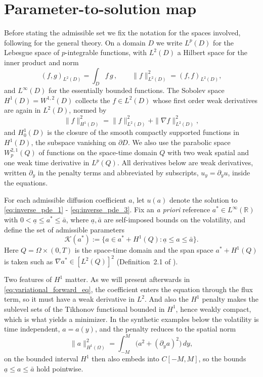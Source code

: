 \section{Parameter-to-solution map}

Before stating the admissible set we fix the notation for the spaces involved,
following \cite[Ch.~8 and 9]{brezis_functional} for the general theory.
On a domain $D$ we write $L^p(D)$ for the Lebesgue space of $p$-integrable functions,
with $L^2(D)$ a Hilbert space for the inner product and norm
\begin{equation*}
    (f,g)_{L^2(D)} = \int_D f\,g\,, \qquad \|f\|_{L^2(D)}^2 = (f,f)_{L^2(D)},
\end{equation*}
and $L^\infty(D)$ for the essentially bounded functions.
The Sobolev space $H^1(D) = W^{1,2}(D)$ collects the $f \in L^2(D)$ whose first order weak
derivatives are again in $L^2(D)$, normed by
\begin{equation*}
    \|f\|_{H^1(D)}^2 = \|f\|_{L^2(D)}^2 + \|\nabla f\|_{L^2(D)}^2,
\end{equation*}
and $H^1_0(D)$ is the closure of the smooth compactly supported functions in $H^1(D)$,
the subspace vanishing on $\partial D$.
We also use the parabolic space $W^{2,1}_p(Q)$ of functions on the space-time domain $Q$
with two weak spatial and one weak time derivative in $L^p(Q)$.
All derivatives below are weak derivatives, written $\partial_y$ in the penalty terms
and abbreviated by subscripts, $u_y = \partial_y u$, inside the equations.

For each admissible diffusion coefficient $a$,
let $u(a)$ denote the solution to \eqref{eq:inverse_pde_1} - \eqref{eq:inverse_pde_3}.
Fix an \emph{a priori} reference $a^* \in L^\infty(\mathbb{R})$ with $0 < \underline{a} \le a^* \le \bar{a}$,
where $\underline{a}, \bar{a}$ are self-imposed bounds on the volatility,
and define the set of admissible parameters
\begin{equation}\label{eq:admissible_set}
    \mathcal{K}(a^*) := \bigl\{ a \in a^* + H^1(Q) : \underline{a} \le a \le \bar{a} \bigr\}.
\end{equation}
Here $Q = \Omega \times (0,T)$ is the space-time domain and the span space $a^* + H^1(Q)$ is taken such as
$\nabla a^* \in [L^2(Q)]^2$ (Definition~2.1 of \cite{egger2005tikhonov}).

Two features of $H^1$ matter.
As we will present afterwards in \eqref{eq:variational_forward_eq},
the coefficient enters the equation through the flux term,
so it must have a weak derivative in $L^2$.
And also the $H^1$ penalty makes the sublevel sets of the Tikhonov functional bounded in $H^1$,
hence weakly compact, which is what yields a minimizer.
In the synthetic examples below the volatility is time independent, $a = a(y)$,
and the penalty reduces to the spatial norm
\begin{equation*}
    \|a\|_{H^1(\Omega)}^2 = \int_{-M}^{M} \bigl(a^2 + (\partial_y a)^2\bigr)\,dy,
\end{equation*}
on the bounded interval $H^1$ then also embeds into $C[-M,M]$,
so the bounds $\underline{a} \le a \le \bar{a}$ hold pointwise.

